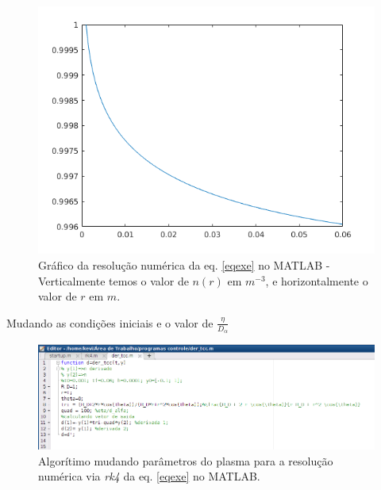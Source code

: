 \documentclass[12pt,oneside,a4paper]{abntex2}
\begin{document}
\begin{figure}[H]
\centering
\includegraphics[scale=0.5]{exemplo1.png} 
\caption{Gráfico da resolução numérica da eq. \ref{eqexe} no MATLAB - Verticalmente temos o valor de $n(r)$ em $m^{-3}$, e horizontalmente o valor de $r$ em $m$.}
\end{figure}

Mudando as condições iniciais e o valor de $\frac{\eta}{D_\alpha}$ 

\begin{figure}[H]
\centering
\includegraphics[scale=0.4]{exemplo2.png} 
\caption{Algorítimo mudando parâmetros do plasma para a resolução numérica via \textit{rk4} da eq. \ref{eqexe} no MATLAB.}
\end{figure}
\end{document}
